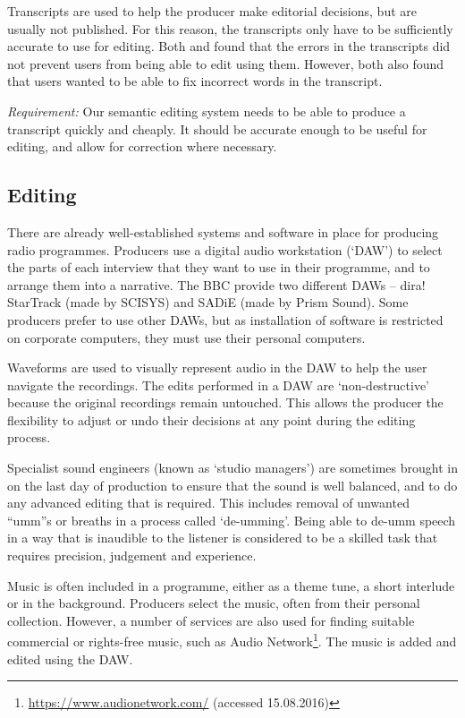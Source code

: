 Transcripts are used to help the producer make editorial decisions, but are
usually not published. For this reason, the transcripts only have to be
sufficiently accurate to use for editing. Both \citet{Whittaker2004} and
\citet{Sivaraman2016} found that the errors in the transcripts did not prevent users
from being able to edit using them. However, both also found that
users wanted to be able to fix incorrect words in the transcript.

\textit{Requirement:} Our semantic editing system needs to be able to produce a transcript quickly
and cheaply. It should be accurate enough to be useful for editing, and allow
for correction where necessary.

\subsection{Editing}
There are already well-established systems and software in place for producing
radio programmes. Producers use a digital audio workstation (`DAW') to select
the parts of each interview that they want to use in their programme, and to
arrange them into a narrative. The BBC provide two different DAWs -- dira!
StarTrack (made by SCISYS) and SADiE (made by Prism Sound). Some producers
prefer to use other DAWs, but as installation of software is restricted on
corporate computers, they must use their personal computers.

Waveforms are used to visually represent audio in the DAW to help the user
navigate the recordings. The edits performed in a DAW are `non-destructive'
because the original recordings remain untouched. This allows the producer the
flexibility to adjust or undo their decisions at any point during the editing
process.

Specialist sound engineers (known as `studio managers') are sometimes brought
in on the last day of production to ensure that the sound is well balanced, and
to do any advanced editing that is required. This includes removal of
unwanted ``umm''s or breaths in a process called `de-umming'. Being able to
de-umm speech in a way that is inaudible to the listener is considered to be a skilled task that
requires precision, judgement and experience.

Music is often included in a programme, either as a theme tune, a short
interlude or in the background. Producers select the music, often from their
personal collection. However, a number of services are also used for finding
suitable commercial or rights-free music, such as Audio
Network\footnote{\url{https://www.audionetwork.com/} (accessed 15.08.2016)}.
The music is added and edited using the DAW.


